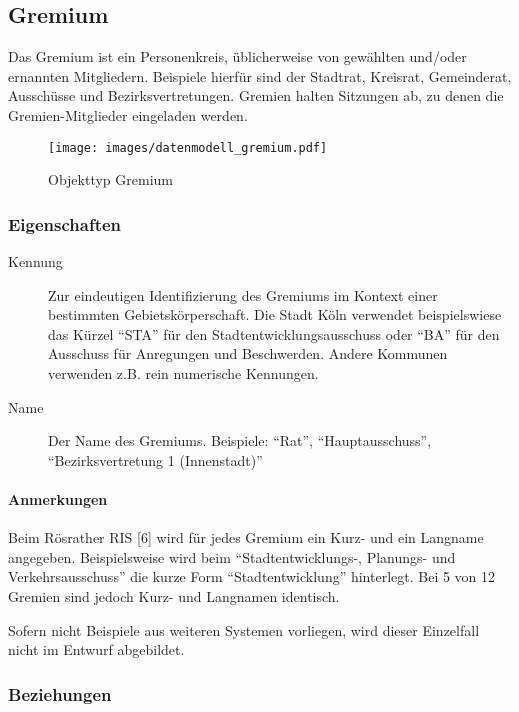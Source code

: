 \documentclass[,a4paper]{article}
\makeatletter
\def\maxwidth{\ifdim\Gin@nat@width>\linewidth\linewidth
\else\Gin@nat@width\fi}
\let\Oldincludegraphics\includegraphics
\renewcommand{\includegraphics}[1]{\Oldincludegraphics[width=\maxwidth]{#1}}
\makeatother
\begin{document}
\subsection{Gremium}

Das Gremium ist ein Personenkreis, üblicherweise von gewählten und/oder
ernannten Mitgliedern. Beispiele hierfür sind der Stadtrat, Kreisrat,
Gemeinderat, Ausschüsse und Bezirksvertretungen. Gremien halten
Sitzungen ab, zu denen die Gremien-Mitglieder eingeladen werden.

\begin{figure}[htbp]
\centering
\texttt{[image: images/datenmodell\_gremium.pdf]}
\caption{Objekttyp Gremium}
\end{figure}

\subsubsection{Eigenschaften}

\begin{description}
\item[Kennung]
Zur eindeutigen Identifizierung des Gremiums im Kontext einer bestimmten
Gebietskörperschaft. Die Stadt Köln verwendet beispielswiese das Kürzel
``STA'' für den Stadtentwicklungsausschuss oder ``BA'' für den Ausschuss
für Anregungen und Beschwerden. Andere Kommunen verwenden z.B. rein
numerische Kennungen.
\item[Name]
Der Name des Gremiums. Beispiele: ``Rat'', ``Hauptausschuss'',
``Bezirksvertretung 1 (Innenstadt)''
\end{description}

\paragraph{Anmerkungen}

Beim Rösrather RIS {[}6{]} wird für jedes Gremium ein Kurz- und ein
Langname angegeben. Beispielsweise wird beim ``Stadtentwicklungs-,
Planungs- und Verkehrsausschuss'' die kurze Form ``Stadtentwicklung''
hinterlegt. Bei 5 von 12 Gremien sind jedoch Kurz- und Langnamen
identisch.

Sofern nicht Beispiele aus weiteren Systemen vorliegen, wird dieser
Einzelfall nicht im Entwurf abgebildet.

\subsubsection{Beziehungen}
\end{document}
